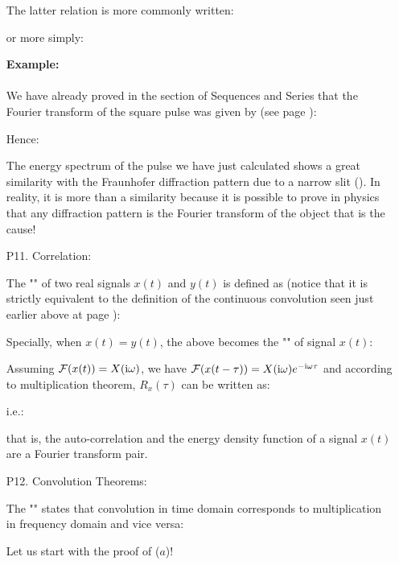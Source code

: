 \begin{itemize}
	The latter relation is more commonly written:
	
	or more simply:
	
	\begin{tcolorbox}[colframe=black,colback=white,sharp corners,breakable]
	\textbf{{\Large {}}Example:}\\\\
	We have already proved in the section of Sequences and Series that the Fourier transform of the square pulse was given by (see page \pageref{fourier transform pulse square}):
	
	Hence:
	
	The energy spectrum of the pulse we have just calculated shows a great similarity with the Fraunhofer diffraction pattern due to a narrow slit (). In reality, it is more than a similarity because it is possible to prove in physics that any diffraction pattern is the Fourier transform of the object that is the cause!
	\end{tcolorbox}
	
	
	\item[P11.] Correlation:
	
	The "" of two real signals $x(t)$ and $y(t)$ is defined as (notice that it is strictly equivalent to the definition of the continuous convolution seen just earlier above at page \pageref{continuous convolution}):
	
	Specially, when $x(t)=y(t)$, the above becomes the "" of signal $x(t)$:
	
	Assuming ${\cal F}(x(t))=X(\mathrm{i}\omega)$, we have ${\cal F}(x(t-\tau))=X(\mathrm{i}\omega)e^{-\mathrm{i}\omega\tau}$ and according to multiplication theorem, $R_x(\tau)$ can be written as:
	
	i.e.:
	
	that is, the auto-correlation and the energy density function of a signal $x(t)$ are a Fourier transform pair.
	
	\item[P12.] Convolution Theorems:
	
	The "\label{convolution theorem}" states that convolution in time domain corresponds to multiplication in frequency domain and vice versa:
	
	
	Let us start with the proof of ($a$)!
	

\end{itemize}
